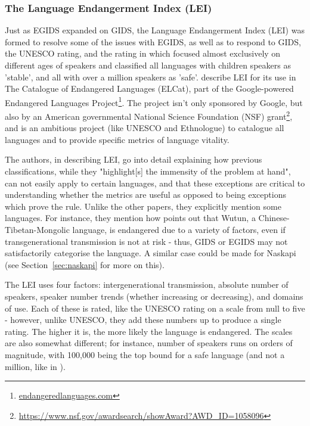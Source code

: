 \subsubsection{The Language Endangerment Index (LEI)}

Just as EGIDS expanded on GIDS, the Language Endangerment Index (LEI) was formed to resolve some of the issues with EGIDS, as well as to respond to GIDS, the UNESCO rating, and the rating in \citet{krauss2007classification} which focused almost exclusively on different ages of speakers and classified all languages with children speakers as 'stable', and all with over a million speakers as 'safe'. \citet{lee2016assessing} describe LEI for its use in The Catalogue of Endangered Languages (ELCat), part of the Google-powered Endangered Languages Project\footnote{\href{endangeredlanguages.com}{endangeredlanguages.com}}. The project isn't only sponsored by Google, but also by an American governmental National Science Foundation (NSF) grant\footnote{\href{https://www.nsf.gov/awardsearch/showAward?AWD\_ID=1058096}{https://www.nsf.gov/awardsearch/showAward?AWD\_ID=1058096}}, and is an ambitious project (like UNESCO and Ethnologue) to catalogue all languages and to provide specific metrics of language vitality.

The authors, in describing LEI, go into detail explaining how previous classifications, while they "highlight[s] the immensity of the problem at hand", can not easily apply to certain languages, and that these exceptions are critical to understanding whether the metrics are useful as opposed to being exceptions which prove the rule. Unlike the other papers, they explicitly mention some languages. For instance, they mention how \citet{dwyer2012tools} points out that Wutun, a Chinese-Tibetan-Mongolic language, is endangered due to a variety of factors, even if transgenerational transmission is not at risk - thus, GIDS or EGIDS may not satisfactorily categorise the language. A similar case could be made for Naskapi (see Section~\ref{sec:naskapi} for more on this).

The LEI uses four factors: intergenerational transmission, absolute number of speakers, speaker number trends (whether increasing or decreasing), and domains of use. Each of these is rated, like the UNESCO rating on a scale from null to five - however, unlike UNESCO, they add these numbers up to produce a single rating. The higher it is, the more likely the language is endangered. The scales are also somewhat different; for instance, number of speakers runs on orders of magnitude, with 100,000 being the top bound for a safe language (and not a million, like in \citet{krauss2007classification}).

